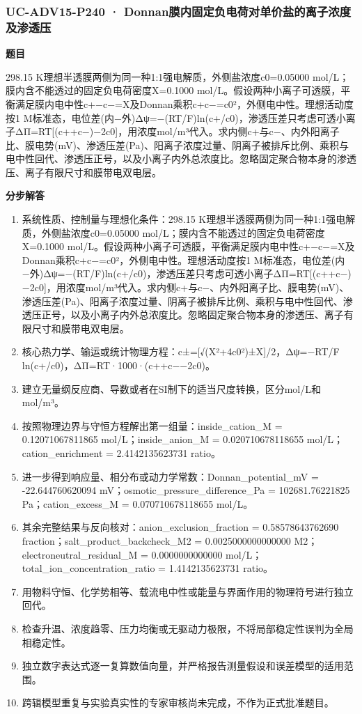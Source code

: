 \documentclass[UTF8,11pt,a4paper]{ctexart}
\begin{document}
\subsubsection*{UC-ADV15-P240 · Donnan膜内固定负电荷对单价盐的离子浓度及渗透压}
\noindent\textbf{题目}\par
298.15 K理想半透膜两侧为同一种1:1强电解质，外侧盐浓度c0=0.05000 mol/L；膜内含不能透过的固定负电荷密度X=0.1000 mol/L。假设两种小离子可透膜，平衡满足膜内电中性c+−c−=X及Donnan乘积c+c−=c0²，外侧电中性。理想活动度按1 M标准态，电位差(内−外)Δψ=−(RT/F)ln(c+/c0)，渗透压差只考虑可透小离子ΔΠ=RT[(c++c−)−2c0]，用浓度mol/m³代入。求内侧c+与c−、内外阳离子比、膜电势(mV)、渗透压差(Pa)、阳离子浓度过量、阴离子被排斥比例、乘积与电中性回代、渗透压正号，以及小离子内外总浓度比。忽略固定聚合物本身的渗透压、离子有限尺寸和膜带电双电层。\par
\medskip\noindent\textbf{分步解答}
\begin{enumerate}
\item 系统性质、控制量与理想化条件：298.15 K理想半透膜两侧为同一种1:1强电解质，外侧盐浓度c0=0.05000 mol/L；膜内含不能透过的固定负电荷密度X=0.1000 mol/L。假设两种小离子可透膜，平衡满足膜内电中性c+−c−=X及Donnan乘积c+c−=c0²，外侧电中性。理想活动度按1 M标准态，电位差(内−外)Δψ=−(RT/F)ln(c+/c0)，渗透压差只考虑可透小离子ΔΠ=RT[(c++c−)−2c0]，用浓度mol/m³代入。求内侧c+与c−、内外阳离子比、膜电势(mV)、渗透压差(Pa)、阳离子浓度过量、阴离子被排斥比例、乘积与电中性回代、渗透压正号，以及小离子内外总浓度比。忽略固定聚合物本身的渗透压、离子有限尺寸和膜带电双电层。
\item 核心热力学、输运或统计物理方程：c±=[√(X²+4c0²)±X]/2，Δψ=−RT/F ln(c+/c0)，ΔΠ=RT·1000·(c++c−−2c0)。
\item 建立无量纲反应商、导数或者在SI制下的适当尺度转换，区分mol/L和mol/m³。
\item 按照物理边界与守恒方程解出第一组量：inside\_cation\_M = 0.12071067811865 mol/L；inside\_anion\_M = 0.020710678118655 mol/L；cation\_enrichment = 2.4142135623731 ratio。
\item 进一步得到响应量、相分布或动力学常数：Donnan\_potential\_mV = -22.644760620094 mV；osmotic\_pressure\_difference\_Pa = 102681.76221825 Pa；cation\_excess\_M = 0.070710678118655 mol/L。
\item 其余完整结果与反向核对：anion\_exclusion\_fraction = 0.58578643762690 fraction；salt\_product\_backcheck\_M2 = 0.0025000000000000 M2；electroneutral\_residual\_M = 0.0000000000000 mol/L；total\_ion\_concentration\_ratio = 1.4142135623731 ratio。
\item 用物料守恒、化学势相等、载流电中性或能量与界面作用的物理符号进行独立回代。
\item 检查升温、浓度趋零、压力均衡或无驱动力极限，不将局部稳定性误判为全局相稳定性。
\item 独立数字表达式逐一复算数值向量，并严格报告测量假设和误差模型的适用范围。
\item 跨辑模型重复与实验真实性的专家审核尚未完成，不作为正式批准题目。
\end{enumerate}
\end{document}
